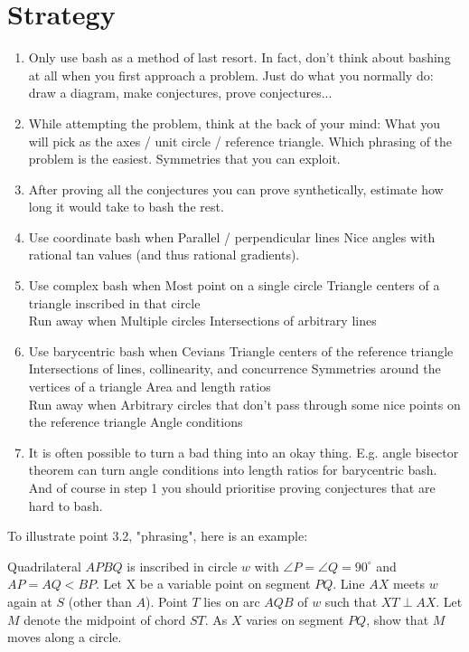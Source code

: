 \documentclass[11pt]{scrartcl}
\begin{document}
\section{Strategy}
\begin{enumerate}
  \item Only use bash as a method of last resort. In fact, don't think about bashing at all when you first approach a problem. Just do what you normally do: draw a diagram, make conjectures, prove conjectures...
  \item While attempting the problem, think at the back of your mind:
    \subitem What you will pick as the axes / unit circle / reference triangle. 
    \subitem Which phrasing of the problem is the easiest.
    \subitem Symmetries that you can exploit.
  \item After proving all the conjectures you can prove synthetically, estimate how long it would take to bash the rest.
  \item Use coordinate bash when
    \subitem Parallel / perpendicular lines
    \subitem Nice angles with rational tan values (and thus rational gradients).
  \item Use complex bash when
    \subitem Most point on a single circle
    \subitem Triangle centers of a triangle inscribed in that circle\\
  Run away when
    \subitem Multiple circles
    \subitem Intersections of arbitrary lines
  \item Use barycentric bash when
    \subitem Cevians
    \subitem Triangle centers of the reference triangle
    \subitem Intersections of lines, collinearity, and concurrence
    \subitem Symmetries around the vertices of a triangle
    \subitem Area and length ratios\\
  Run away when
    \subitem Arbitrary circles that don't pass through some nice points on the reference triangle 
    \subitem Angle conditions
  \item It is often possible to turn a bad thing into an okay thing. E.g. angle bisector theorem can turn angle conditions into length ratios for barycentric bash. And of course in step 1 you should prioritise proving conjectures that are hard to bash. 
\end{enumerate}
To illustrate point 3.2, "phrasing", here is an example:
\begin{example} [USAMO 2015/2]
  Quadrilateral $APBQ$ is inscribed in circle $w$ with $\angle P = \angle Q = 90^{\circ}$ and $AP=AQ<BP$. Let X be a variable point on segment $PQ$. Line $AX$ meets $w$ again at $S$ (other than $A$). Point $T$ lies on arc $AQB$ of $w$ such that $XT \perp AX$. Let $M$ denote the midpoint of chord $ST$. As $X$ varies on segment $PQ$, show that $M$ moves along a circle.
\end{example}
\end{document}
